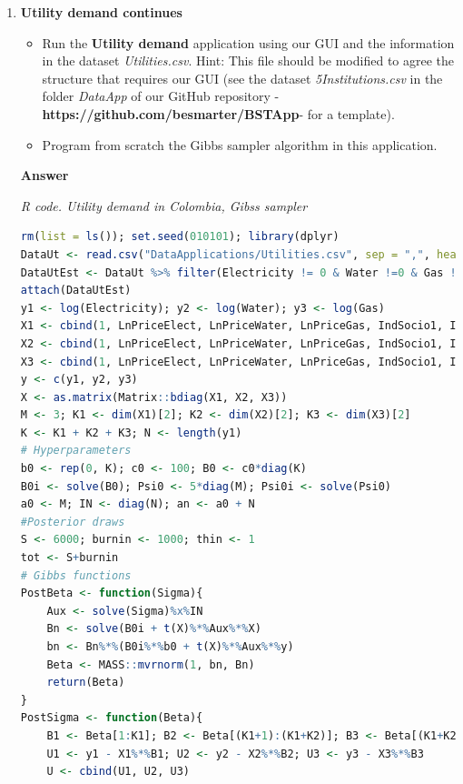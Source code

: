 \begin{enumerate}[leftmargin=*]
\item \textbf{Utility demand continues}

\begin{itemize}
	\item Run the \textbf{Utility demand} application using our GUI and the information in the dataset \textit{Utilities.csv}. Hint: This file should be modified to agree the structure that requires our GUI (see the dataset \textit{5Institutions.csv} in the folder \textit{DataApp} of our GitHub repository -\textbf{https://github.com/besmarter/BSTApp}- for a template).
	\item Program from scratch the Gibbs sampler algorithm in this application.   
\end{itemize}

\textbf{Answer}

\begin{tcolorbox}[enhanced,width=4.67in,center upper,
	fontupper=\large\bfseries,drop shadow southwest,sharp corners]
	\textit{R code. Utility demand in Colombia, Gibss sampler}
	\begin{VF}
		\begin{lstlisting}[language=R]
rm(list = ls()); set.seed(010101); library(dplyr)
DataUt <- read.csv("DataApplications/Utilities.csv", sep = ",", header = TRUE, fileEncoding = "latin1")
DataUtEst <- DataUt %>% filter(Electricity != 0 & Water !=0 & Gas != 0)
attach(DataUtEst)
y1 <- log(Electricity); y2 <- log(Water); y3 <- log(Gas)
X1 <- cbind(1, LnPriceElect, LnPriceWater, LnPriceGas, IndSocio1, IndSocio2, Altitude, Nrooms, HouseholdMem, Lnincome)
X2 <- cbind(1, LnPriceElect, LnPriceWater, LnPriceGas, IndSocio1, IndSocio2, Nrooms, HouseholdMem)
X3 <- cbind(1, LnPriceElect, LnPriceWater, LnPriceGas, IndSocio1, IndSocio2, Altitude, Nrooms, HouseholdMem)
y <- c(y1, y2, y3)
X <- as.matrix(Matrix::bdiag(X1, X2, X3))
M <- 3; K1 <- dim(X1)[2]; K2 <- dim(X2)[2]; K3 <- dim(X3)[2] 
K <- K1 + K2 + K3; N <- length(y1)
# Hyperparameters
b0 <- rep(0, K); c0 <- 100; B0 <- c0*diag(K)
B0i <- solve(B0); Psi0 <- 5*diag(M); Psi0i <- solve(Psi0)
a0 <- M; IN <- diag(N); an <- a0 + N
#Posterior draws
S <- 6000; burnin <- 1000; thin <- 1
tot <- S+burnin
# Gibbs functions
PostBeta <- function(Sigma){
	Aux <- solve(Sigma)%x%IN
	Bn <- solve(B0i + t(X)%*%Aux%*%X)
	bn <- Bn%*%(B0i%*%b0 + t(X)%*%Aux%*%y)
	Beta <- MASS::mvrnorm(1, bn, Bn)
	return(Beta)
}
PostSigma <- function(Beta){
	B1 <- Beta[1:K1]; B2 <- Beta[(K1+1):(K1+K2)]; B3 <- Beta[(K1+K2+1):(K1+K2+K3)]
	U1 <- y1 - X1%*%B1; U2 <- y2 - X2%*%B2; U3 <- y3 - X3%*%B3
	U <- cbind(U1, U2, U3)

\end{lstlisting}
\end{VF}
\end{tcolorbox}
\end{enumerate}

